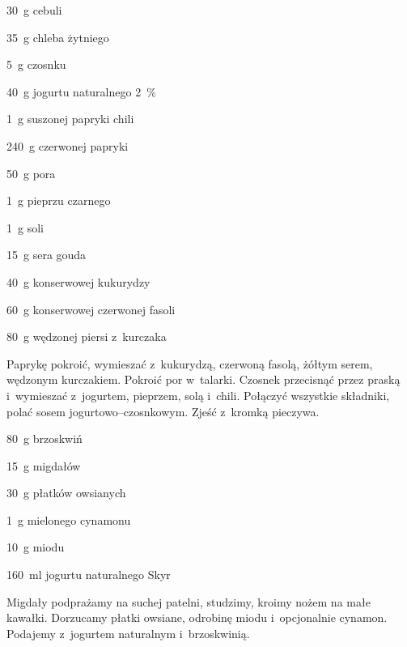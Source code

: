\documentclass[../main.tex]{subfiles}
\begin{document}
\begin{Ingred}
    \item \qty{30}{\gram} cebuli
    \item \qty{35}{\gram} chleba żytniego
    \item \qty{5}{\gram} czosnku
    \item \qty{40}{\gram} jogurtu naturalnego \qty{2}{\percent}
    \item \qty{1}{\gram} suszonej papryki chili
    \item \qty{240}{\gram} czerwonej papryki
    \item \qty{50}{\gram} pora
    \item \qty{1}{\gram} pieprzu czarnego
    \item \qty{1}{\gram} soli
    \item \qty{15}{\gram} sera gouda
    \item \qty{40}{\gram} konserwowej kukurydzy
    \item \qty{60}{\gram} konserwowej czerwonej fasoli
    \item \qty{80}{\gram} wędzonej piersi z~kurczaka
\end{Ingred}

Paprykę pokroić, wymieszać z~kukurydzą, czerwoną fasolą, żółtym serem, wędzonym
kurczakiem. Pokroić por w~talarki. Czosnek przecisnąć przez praską i~wymieszać
z~jogurtem, pieprzem, solą i~chili. Połączyć wszystkie składniki, polać sosem
jogurtowo--czosnkowym. Zjeść z~kromką pieczywa.


\begin{Ingred}
    \item \qty{80}{\gram} brzoskwiń
    \item \qty{15}{\gram} migdałów
    \item \qty{30}{\gram} płatków owsianych
    \item \qty{1}{\gram} mielonego cynamonu
    \item \qty{10}{\gram} miodu
    \item \qty{160}{\milli\litre} jogurtu naturalnego Skyr
\end{Ingred}

Migdały podprażamy na suchej patelni, studzimy, kroimy nożem na małe kawałki.
Dorzucamy płatki owsiane, odrobinę miodu i~opcjonalnie cynamon. Podajemy
z~jogurtem naturalnym i~brzoskwinią.

\end{document}
